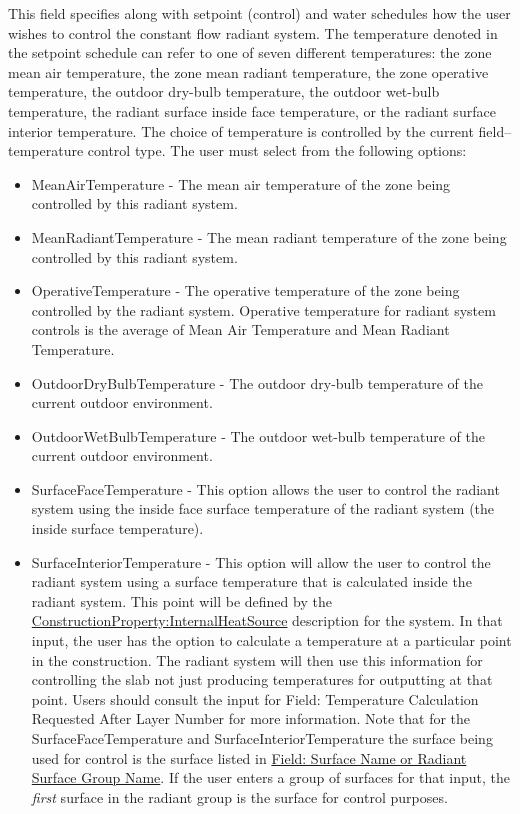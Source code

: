 This field specifies along with setpoint (control) and water schedules how the user wishes to control the constant flow radiant system. The temperature denoted in the setpoint schedule can refer to one of seven different temperatures: the zone mean air temperature, the zone mean radiant temperature, the zone operative temperature, the outdoor dry-bulb temperature, the outdoor wet-bulb temperature, the radiant surface inside face temperature, or the radiant surface interior temperature. The choice of temperature is controlled by the current field--temperature control type. The user must select from the following options:

\begin{itemize}
\item
  MeanAirTemperature - The mean air temperature of the zone being controlled by this radiant system.
\item
  MeanRadiantTemperature - The mean radiant temperature of the zone being controlled by this radiant system.
\item
  OperativeTemperature - The operative temperature of the zone being controlled by the radiant system. Operative temperature for radiant system controls is the average of Mean Air Temperature and Mean Radiant Temperature.  
\item
  OutdoorDryBulbTemperature - The outdoor dry-bulb temperature of the current outdoor environment.
\item
  OutdoorWetBulbTemperature - The outdoor wet-bulb temperature of the current outdoor environment.
\item
  SurfaceFaceTemperature - This option allows the user to control the radiant system using the inside face surface temperature of the radiant system (the inside surface temperature).
\item SurfaceInteriorTemperature - This option will allow the user to control
      the radiant system using a surface temperature that is calculated inside
      the radiant system.  This point will be defined by the
      \hyperref[constructioninternalsource]{ConstructionProperty:InternalHeatSource}
      description for the system.  In that input, the user has the option to
      calculate a temperature at a particular point in the construction.  The
      radiant system will then use this information for controlling the slab
      not just producing temperatures for outputting at that point.  Users
      should consult the input for Field: Temperature Calculation Requested
      After Layer Number for more information.  Note that for the
      SurfaceFaceTemperature and SurfaceInteriorTemperature the surface being
      used for control is the surface listed in \hyperref[field-surface-name-or-radiant-surface-group-name-2]{Field: Surface Name or Radiant Surface Group Name}.  If the user enters a group of surfaces for that input, the
      \emph{first} surface in the radiant group is the surface for control
      purposes.
\end{itemize}

